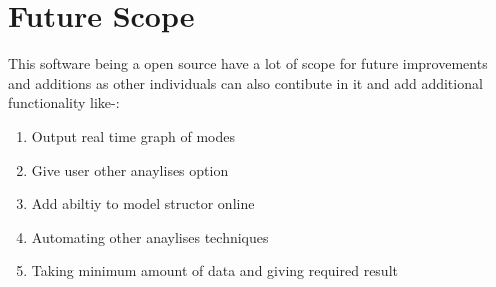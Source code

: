 \section{Future Scope}
This software being a open source have a lot of scope for future improvements
and additions as other individuals can also contibute in it and add additional functionality 
like-:
\begin{enumerate}
\item Output real time graph of modes 
\item Give user other anaylises option 
\item Add abiltiy to model structor online
\item Automating other anaylises techniques
\item Taking minimum amount of data and giving required result
\end{enumerate} 

